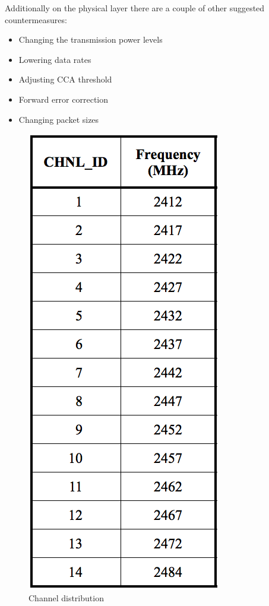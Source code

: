 	Additionally on the physical layer there are a couple of other suggested countermeasures:
	\begin{itemize}
	\item Changing the transmission power levels
	\item Lowering data rates
	\item Adjusting CCA threshold
	\item Forward error correction
	\item Changing packet sizes
	\end{itemize}


	\begin{figure}
		\caption{Channel distribution}
		\label{fig:channels}
		\includegraphics[width=1\linewidth]{Images/Channels80211.png}

\end{figure}
